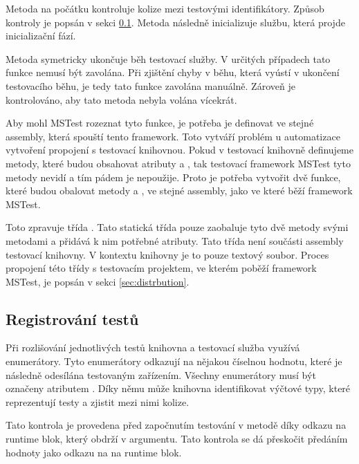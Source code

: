 Metoda  na počátku kontroluje kolize mezi testovými identifikátory. Způsob kontroly je popsán v sekci \ref{sec:reg_test_impl}. Metoda následně inicializuje službu, která projde inicializační fází. 

Metoda  symetricky ukončuje běh testovací služby. V určitých případech tato funkce nemusí být zavolána. Při zjištění chyby v běhu, která vyústí v ukončení testovacího běhu, je tedy tato funkce zavolána manuálně. Zároveň je kontrolováno, aby tato metoda nebyla volána vícekrát.

Aby mohl MSTest rozeznat tyto funkce, je potřeba je definovat ve stejné assembly, která spouští tento framework. Toto vytváří problém u automatizace vytvoření propojení s testovací knihovnou. Pokud v testovací knihovně definujeme metody, které budou obsahovat atributy  a , tak testovací framework  MSTest tyto metody nevidí a tím pádem je nepoužije. Proto je potřeba vytvořit dvě funkce, které budou obalovat metody  a , ve stejné assembly, jako ve které běží framework MSTest.

Toto zpravuje třída . Tato statická třída pouze zaobaluje tyto dvě metody svými metodami a přidává k nim potřebné atributy. Tato třída není součásti assembly testovací knihovny. V kontextu knihovny je to pouze textový soubor. Proces propojení této třídy s testovacím projektem, ve kterém poběží framework MSTest, je popsán v sekci \ref{sec:distrbution}.

\subsection{Registrování testů}\label{sec:reg_test_impl}

Při rozlišování jednotlivých testů knihovna a testovací služba využívá enumerátory. Tyto enumerátory odkazují na nějakou číselnou hodnotu, které je následně odesílána testovaným zařízením. Všechny enumerátory musí být označeny atributem . Díky němu může knihovna identifikovat výčtové typy, které reprezentují testy a zjistit mezi nimi kolize. 

Tato kontrola je provedena před započnutím testování v metodě  díky odkazu na runtime blok, který obdrží v argumentu. Tato kontrola se dá přeskočit předáním hodnoty  jako odkazu na na runtime blok.

